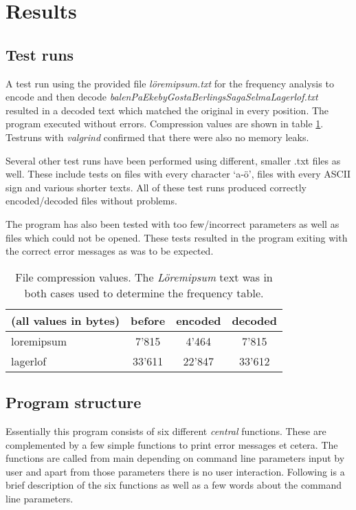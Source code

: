 \documentclass[a4paper,11pt,twoside]{article}
\begin{document}
\section{Results}
\subsection{Test runs}
A test run using the provided file \emph{löremipsum.txt} for the
frequency analysis to encode and then decode
\emph{balenPaEkebyGostaBerlingsSagaSelmaLagerlof.txt} resulted in a
decoded text which matched the original in every position. The program
executed without errors. Compression values are shown in table \ref{tab:compression}. Testruns with \emph{valgrind} confirmed that 
there were also no memory leaks. 

Several other test runs have been performed using different, smaller
.txt files as well. These include tests on files with every character
`a-ö', files with every ASCII sign and various shorter texts. All of
these test runs produced correctly encoded/decoded files without
problems.


The program has also been tested with too few/incorrect parameters as
well as files which could not be opened. These tests resulted in the
program exiting with the correct error messages as was to be expected.

\begin{table}[]
\centering
\caption{File compression values. The \emph{Löremipsum} text was in
  both cases used to determine the frequency table.}
\label{tab:compression}
\begin{tabular}{lccc}
(all values in bytes) & \multicolumn{1}{l}{before} & \multicolumn{1}{l}{encoded} & \multicolumn{1}{l}{decoded} \\ \hline
loremipsum            & 7'815                      & 4'464
& 7'815                       \\
lagerlof              & 33'611                     & 22'847
& 33'612                     
\end{tabular}
\end{table}


\subsection{Program structure}
Essentially this program consists of six different \emph{central} functions. These are complemented by a few simple functions to print error messages et cetera. The functions are called from main depending on command line parameters input by user and apart from those parameters there is no user interaction. Following is a brief description of the six functions as well as a few words about the command line parameters.
\end{document}
